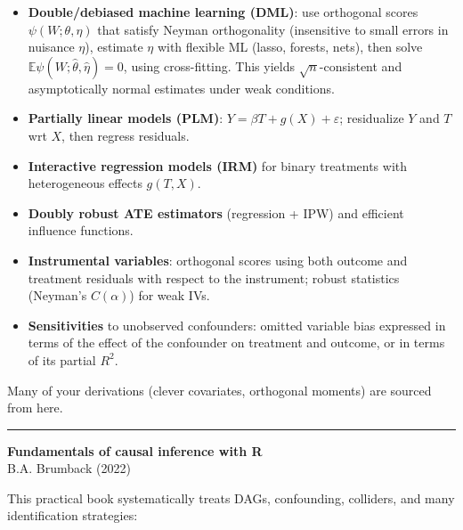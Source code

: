 \documentclass[a5paper]{article}
\providecommand{\tightlist}{%
  \setlength{\itemsep}{0pt}\setlength{\parskip}{0pt}}
\begin{document}
\begin{itemize}
\tightlist
\item
  \textbf{Double/debiased machine learning (DML)}: use orthogonal scores
  $\psi(W;\theta,\eta)$ that satisfy Neyman orthogonality (insensitive to small
  errors in nuisance $\eta$), estimate $\eta$ with flexible ML (lasso, forests,
  nets), then solve \(\mathbb{E}\psi(W;\hat\theta,\hat\eta)=0\), using
  cross-fitting. This yields $\sqrt n$-consistent and asymptotically
  normal estimates under weak conditions.
\item
  \textbf{Partially linear models (PLM)}:
  $Y = \beta T + g(X)+\varepsilon$; residualize $Y$ and $T$ wrt $X$, then
  regress residuals.
\item
  \textbf{Interactive regression models (IRM)} for binary treatments
  with heterogeneous effects $g(T,X)$.
\item
  \textbf{Doubly robust ATE estimators} (regression + IPW) and efficient
  influence functions.
\item
  \textbf{Instrumental variables}: orthogonal scores using both outcome
  and treatment residuals with respect to the instrument; robust
  statistics (Neyman's $C(\alpha)$) for weak IVs.
\item
  \textbf{Sensitivities} to unobserved confounders: omitted variable
  bias expressed in terms of the effect of the confounder on treatment
  and outcome, or in terms of its partial $R^2$.
\end{itemize}

Many of your derivations (clever covariates, orthogonal moments) are
sourced from here.

\begin{center}\rule{0.5\linewidth}{0.5pt}\end{center}

\textbf{Fundamentals of causal inference with R}\\
B.A. Brumback (2022)

This practical book systematically treats DAGs, confounding, colliders,
and many identification strategies:
\end{document}
